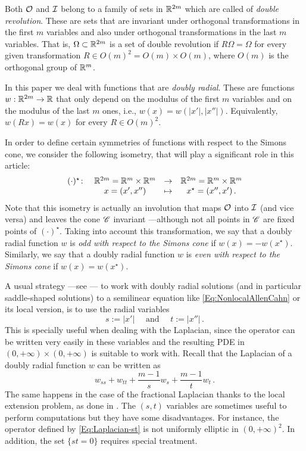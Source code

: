 Both $\mathcal{O}$ and $\mathcal{I}$ belong to a family of sets in $\mathbb{R}^{2m}$ which are called of \emph{double revolution}. These are sets that are invariant under orthogonal transformations in the first $m$ variables and also under orthogonal transformations in the last $m$ variables. That is, $\Omega\subset \mathbb{R}^{2m}$ is a set of double revolution if $R\Omega = \Omega$ for every given transformation $R\in O(m)^2 = O(m) \times O(m)$, where  $O(m)$ is the orthogonal group of $\mathbb{R}^m$.

In this paper we deal with functions that are \emph{doubly radial}. These are functions $w:\mathbb{R}^{2m}  \to \mathbb{R}$ that only depend on the modulus of the first $m$ variables and on the modulus of the last $m$ ones, i.e., $w(x) = w(|x'|,|x''|)$. Equivalently, $w(Rx) = w(x)$ for every $R \in O(m)^2$.

In order to define certain symmetries of functions with respect to the Simons cone, we consider the following isometry, that will play a significant role in this article:
\begin{equation}
\label{Eq:DefStar}
\begin{matrix}
(\cdot)^\star \colon & \mathbb{R}^{2m}= \mathbb{R}^{m}\times \mathbb{R}^{m}  &\to&  \mathbb{R}^{2m}= \mathbb{R}^{m}\times \mathbb{R}^{m}  \\
& x = (x',x'') &\mapsto & x^\star = (x'',x')\,.
\end{matrix}
\end{equation}
Note that this isometry is actually an involution that maps $\mathcal{O}$ into $\mathcal{I}$ (and vice versa) and leaves the cone $\mathscr{C}$ invariant ---although not all points in $\mathscr{C}$ are fixed points of $(\cdot)^\star$. Taking into account this transformation, we say that a doubly radial function $w$ is \emph{odd with respect to the Simons cone} if $w(x) = -w(x^\star)$. Similarly, we say that a doubly radial function $w$ is \emph{even with respect to the Simons cone} if $w(x) = w(x^\star)$.

A usual strategy ---see \cite{CabreTerraI, CabreTerraII,Cabre-Saddle, CabreRosOton-DoubleRev, Cinti-Saddle, Cinti-Saddle2, Felipe-Sanz-Perela:SaddleFractional}--- to work with doubly radial solutions (and in particular saddle-shaped solutions) to a semilinear equation like \eqref{Eq:NonlocalAllenCahn} or its local version, is to use the radial variables 
$$
s := |x'| \quad \text{ and } \quad t:=|x''|\,.
$$
This is specially useful when dealing with the Laplacian, since the operator can be written very easily in these variables and the resulting PDE in $(0,+\infty)\times (0,+\infty)$ is suitable to work with. Recall that the Laplacian of a doubly radial function $w$ can be written as
\begin{equation}
	\label{Eq:Laplacian-st}
	w_{ss} + w_{tt} + \frac{m-1}{s}w_s + \frac{m-1}{t}w_t\,.
\end{equation}
 The same happens in the case of the fractional Laplacian thanks to the local extension problem, as done in \cite{Cinti-Saddle, Cinti-Saddle2, Felipe-Sanz-Perela:SaddleFractional}. The $(s,t)$ variables are sometimes useful to perform computations but they have some disadvantages. For instance, the operator defined by \eqref{Eq:Laplacian-st} is not uniformly elliptic in $(0,+\infty)^2$. In addition, the set $\{st=0\}$ requires special treatment.
 

